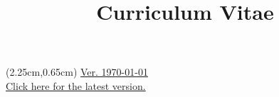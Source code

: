 \documentclass[a4paper,skipsamekey,11pt,english]{curve}
\title{Curriculum Vitae}
\begin{document}
\begin{textblock*}{14cm}(2.25cm,0.65cm) %
  \href{https://github.com/DT1000101}{
    \scriptsize Ver. \today \\
    \scriptsize Click here for the latest version.
  }
\end{textblock*}

\makeheaders[c]


\pagebreak




\pagebreak


\end{document}
